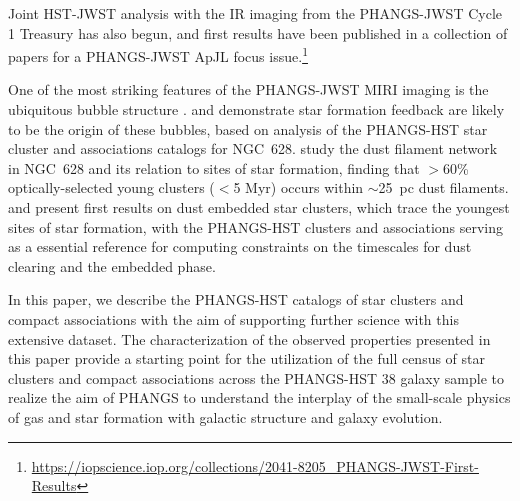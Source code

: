 \documentclass[linenumbers]{aastex63}
\begin{document}
Joint HST-JWST analysis with the IR imaging from the PHANGS-JWST Cycle 1 Treasury has also begun, and first results have been published in a collection of papers for a PHANGS-JWST ApJL focus issue.\footnote{\url{https://iopscience.iop.org/collections/2041-8205_PHANGS-JWST-First-Results}}  

One of the most striking features of the PHANGS-JWST MIRI imaging is the ubiquitous bubble structure \citep{lee_phangs-jwst_2023}. \citet{watkins_phangs-jwst_2023} and \citet{barnes_phangs-jwst_2023} demonstrate star formation feedback are likely to be the origin of these bubbles, based on analysis of the PHANGS-HST star cluster and associations catalogs for NGC~628.  \citet{thilker_phangs-jwst_2023} study the dust filament network in NGC~628 and its relation to sites of star formation, finding that $>$60\% optically-selected young clusters ($<$5 Myr) occurs within $\sim$25~pc dust filaments. \citet{rodriguez_phangs-jwst_2023} and \citet{whitmore_phangs-jwst_2023} present first results on dust embedded star clusters, which trace the youngest sites of star formation, with the PHANGS-HST clusters and associations serving as a essential reference for computing constraints on the timescales for dust clearing and the embedded phase.


In this paper, we describe the PHANGS-HST catalogs of star clusters and compact associations with the aim of supporting further science with this extensive dataset.  The characterization of the observed properties presented in this paper provide a starting point for the utilization of the full census of star clusters and compact associations across the PHANGS-HST 38 galaxy sample to realize the aim of PHANGS to understand the interplay of the small-scale physics of gas and star formation with galactic structure and galaxy evolution.
\end{document}
